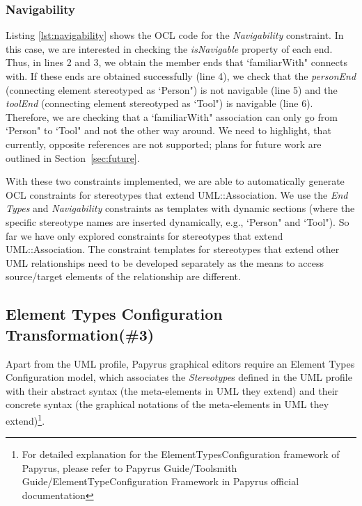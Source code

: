 \subsubsection{Navigability}
Listing \ref{lst:navigability} shows the OCL code for the \emph{Navigability} constraint. 
In this case, we are interested in checking the \emph{isNavigable} property of each end. 
Thus, in lines 2 and 3, we obtain the member ends that `familiarWith" connects with. 
If these ends are obtained successfully (line 4), we check that the \emph{personEnd} (connecting element stereotyped as `Person") is not navigable (line 5) and the \emph{toolEnd} (connecting element stereotyped as `Tool") is navigable (line 6). 
Therefore, we are checking that a `familiarWith" association can only go from `Person" to `Tool" and not the other way around. 
We need to highlight, that currently, opposite references are not supported; plans for future work are outlined in Section~\ref{sec:future}.

\begin{figure}[h]
	
\end{figure}

With these two constraints implemented, we are able to automatically generate OCL constraints for stereotypes that extend UML::Association. 
We use the \emph{End Types} and \emph{Navigability} constraints as templates with dynamic sections (where the specific stereotype names are inserted dynamically, e.g., `Person" and `Tool"). 
So far we have only explored constraints for stereotypes that extend UML::Association. 
The constraint templates for stereotypes that extend other UML relationships need to be developed separately as the means to access source/target elements of the relationship are different.

\subsection{Element Types  Configuration Transformation(\#3)}
\label{sec:elementTypes}
Apart from the UML profile, Papyrus graphical editors require an Element Types Configuration model, which associates the \textit{Stereotype}s defined in the UML profile with their abstract syntax (the meta-elements in UML they extend) and their concrete syntax (the graphical notations of the meta-elements in UML they extend)\footnote{For detailed explanation for the ElementTypesConfiguration framework of Papyrus, please refer to Papyrus Guide/Toolsmith Guide/ElementTypeConfiguration Framework in Papyrus official documentation}. 

